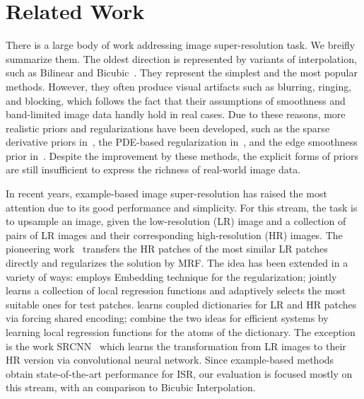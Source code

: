 \documentclass[10pt,twocolumn,letterpaper]{article}
\begin{document}
\section{Related Work}
\label{sec:relatedwork}
There is a large body of work addressing image super-resolution
task. We breifly summarize them. %
The oldest direction is represented by variants of interpolation, such as Bilinear and Bicubic~\cite{Duchon-JAM-1979,Thevenaz-BOOK-2000}. They
represent the simplest and the most popular methods. However, they
often produce visual artifacts such as blurring, ringing, and
blocking, which follows the fact that their assumptions of smoothness
and band-limited image data handly hold in real cases. Due to these
reasons, more realistic priors and regularizations have been
developed, such as the sparse derivative priors
in~\cite{Tappen-WSCTV-2003}, the PDE-based regularization
in~\cite{Tschumperle-PAMI-2005}, and the edge smoothness prior
in~\cite{Dai-CVPR-2007}. Despite the improvement by these methods, the
explicit forms of priors are still insufficient to express the
richness of real-world image data.

In recent years, example-based image super-resolution has raised the
most attention due to its good performance and simplicity. For this
stream, the task is to upsample an image, given the low-resolution
(LR) image and a collection of pairs of LR images and their
corresponding high-resolution (HR) images. The pioneering
work~\cite{Freeman-CGA-2002} transfers the HR patches of the most
similar LR patches directly and regularizes the solution by MRF. The
idea has been extended in a variety of ways: \cite{Chang-CVPR-2004}
employs Embedding technique for the regularization; \cite{JOR:EG15}
jointly learns a collection of local regression functions and
adaptively selects the most suitable ones for test patches.
\cite{Yang-TIP-2010} learns coupled dictionaries for LR and HR patches
via forcing shared encoding; \cite{Timofte-ICCV-2013,
  Timofte-ACCV-2014} combine the two ideas for efficient systems by
learning local regression functions for the atoms of the
dictionary. The exception is the work SRCNN~\cite{Dong-ECCV-2014}
which learns the transformation from LR images to their HR version via
convolutional neural network. Since example-based methods obtain
state-of-the-art performance for ISR, our evaluation is focused
mostly on this stream, with an comparison to Bicubic Interpolation.
\end{document}
